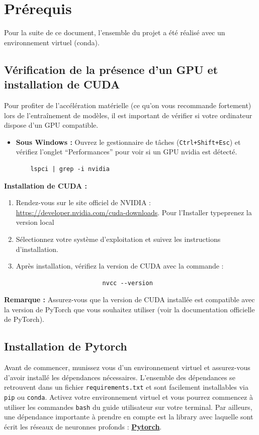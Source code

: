 \section{Prérequis}
Pour la suite de ce document, l'ensemble du projet a été réalisé avec un environnement virtuel (conda).

\subsection{Vérification de la présence d'un GPU et installation de CUDA}

Pour profiter de l'accélération matérielle (ce qu'on vous recommande fortement) lors de l'entraînement de modèles, il est important de vérifier si votre ordinateur dispose d'un GPU compatible.

\begin{itemize}
    \item \textbf{Sous Windows :} Ouvrez le gestionnaire de tâches (\texttt{Ctrl+Shift+Esc}) et vérifiez l'onglet ``Performances'' pour voir si un GPU nvidia est détecté.
    \begin{verbatim}
    lspci | grep -i nvidia
    \end{verbatim}
\end{itemize}

\textbf{Installation de CUDA :}

\begin{enumerate}
    \item Rendez-vous sur le site officiel de NVIDIA : \url{https://developer.nvidia.com/cuda-downloads}. Pour l'Installer typeprenez la version local
    \item Sélectionnez votre système d'exploitation et suivez les instructions d'installation.
    \item Après installation, vérifiez la version de CUDA avec la commande :
    \begin{verbatim} 
                        nvcc --version
    \end{verbatim}
\end{enumerate}

\textbf{Remarque :} Assurez-vous que la version de CUDA installée est compatible avec la version de PyTorch que vous souhaitez utiliser (voir la documentation officielle de PyTorch).

\subsection{Installation de Pytorch}
Avant de commencer, munissez vous d'un environnement virtuel et assurez-vous d'avoir installé les dépendances nécessaires. L'ensemble des dépendances se retrouvent dans un fichier \texttt{requirements.txt} et sont facilement installables via \texttt{pip} ou \texttt{conda}.
Activez votre environnement virtuel et vous pourrez commencez à utiliser les commandes \texttt{bash} du guide utilisateur sur votre terminal.
Par ailleurs, une dépendance importante à prendre en compte est la library avec laquelle sont écrit les réseaux de neuronnes profonds : \textbf{\href{https://pytorch.org/get-started/locally/}{Pytorch}}.

